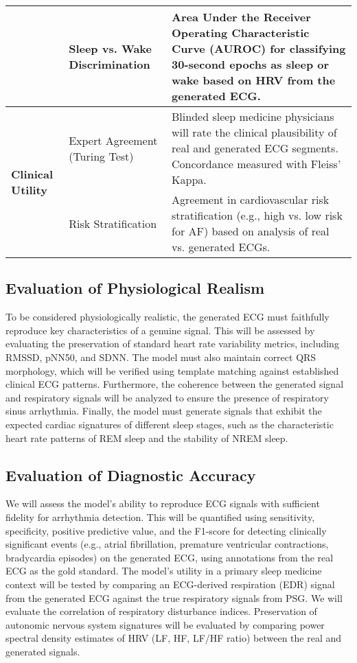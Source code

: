 \documentclass[10pt, conference]{IEEEtran}
\begin{document}
\begin{table}[H]
\begin{tabular}{p{} p{} p{}}
        \cline{2-3}
        & Sleep vs. Wake Discrimination & Area Under the Receiver Operating Characteristic Curve (AUROC) for classifying 30-second epochs as sleep or wake based on HRV from the generated ECG. \\
        \midrule
        \multirow{2}{*}{\textbf{Clinical Utility}}
        & Expert Agreement (Turing Test) & Blinded sleep medicine physicians will rate the clinical plausibility of real and generated ECG segments. Concordance measured with Fleiss' Kappa. \\
        \cline{2-3}
        & Risk Stratification & Agreement in cardiovascular risk stratification (e.g., high vs. low risk for AF) based on analysis of real vs. generated ECGs. \\
        \bottomrule
    \end{tabular}
\end{table}

\subsection{Evaluation of Physiological Realism}
To be considered physiologically realistic, the generated ECG must faithfully reproduce key characteristics of a genuine signal. This will be assessed by evaluating the preservation of standard heart rate variability metrics, including RMSSD, pNN50, and SDNN. The model must also maintain correct QRS morphology, which will be verified using template matching against established clinical ECG patterns. Furthermore, the coherence between the generated signal and respiratory signals will be analyzed to ensure the presence of respiratory sinus arrhythmia. Finally, the model must generate signals that exhibit the expected cardiac signatures of different sleep stages, such as the characteristic heart rate patterns of REM sleep and the stability of NREM sleep.

\subsection{Evaluation of Diagnostic Accuracy}
We will assess the model's ability to reproduce ECG signals with sufficient fidelity for arrhythmia detection. This will be quantified using sensitivity, specificity, positive predictive value, and the F1-score for detecting clinically significant events (e.g., atrial fibrillation, premature ventricular contractions, bradycardia episodes) on the generated ECG, using annotations from the real ECG as the gold standard. The model's utility in a primary sleep medicine context will be tested by comparing an ECG-derived respiration (EDR) signal from the generated ECG against the true respiratory signals from PSG. We will evaluate the correlation of respiratory disturbance indices. Preservation of autonomic nervous system signatures will be evaluated by comparing power spectral density estimates of HRV (LF, HF, LF/HF ratio) between the real and generated signals.
\end{document}
